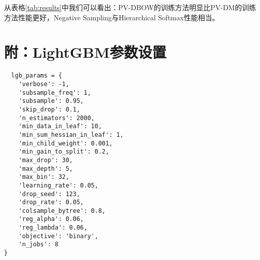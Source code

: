 \documentclass{article}
\begin{document}
从表格\ref{tab:results}中我们可以看出：PV-DBOW的训练方法明显比PV-DM的训练方法性能更好，Negative Sampling与Hierarchical Softmax性能相当。



\appendix

\section{附：LightGBM参数设置}
\begin{lstlisting}
  lgb_params = { 
    'verbose': -1, 
    'subsample_freq': 1, 
    'subsample': 0.95, 
    'skip_drop': 0.1, 
    'n_estimators': 2000, 
    'min_data_in_leaf': 10,
    'min_sum_hessian_in_leaf': 1, 
    'min_child_weight': 0.001,
    'min_gain_to_split': 0.2, 
    'max_drop': 30, 
    'max_depth': 5, 
    'max_bin': 32, 
    'learning_rate': 0.05, 
    'drop_seed': 123, 
    'drop_rate': 0.05, 
    'colsample_bytree': 0.8, 
    'reg_alpha': 0.06,
    'reg_lambda': 0.06,
    'objective': 'binary',
    'n_jobs': 8
}
\end{lstlisting}


\end{document}
